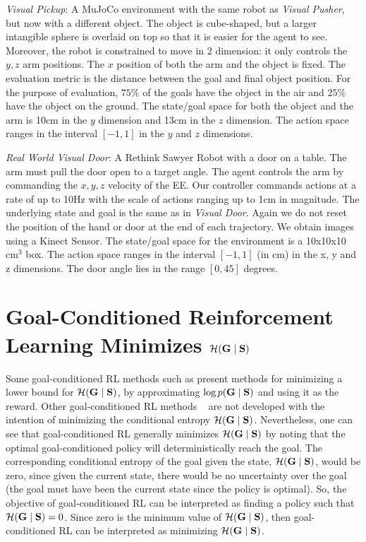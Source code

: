 \textit{Visual Pickup}: A MuJoCo environment with the same robot as \textit{Visual Pusher}, but now with a different object. The object is cube-shaped, but a larger intangible sphere is overlaid on top so that it is easier for the agent to see.
Moreover, the robot is constrained to move in 2 dimension: it only controls the $y, z$ arm positions.
The $x$ position of both the arm and the object is fixed.
The evaluation metric is the distance between the goal and final object position.
For the purpose of evaluation, $75\%$ of the goals have the object in the air and $25\%$ have the object on the ground. The state/goal space for both the object and the arm is 10cm in the $y$ dimension and 13cm in the $z$ dimension. The action space ranges in the interval $[-1, 1]$ in the $y$ and $z$ dimensions.

\textit{Real World Visual Door}:
A Rethink Sawyer Robot with a door on a table.
The arm must pull the door open to a target angle.
The agent controls the arm by commanding the $x,y,z$ velocity of the EE.
Our controller commands actions at a rate of up to 10Hz with the scale of actions ranging up to 1cm in magnitude.
The underlying state and goal is the same as in \textit{Visual Door}.
Again we do not reset the position of the hand or door at the end of each trajectory.
We obtain images using a Kinect Sensor.
The state/goal space for the environment is a 10x10x10 cm$^3$ box. The action space ranges in the interval $[-1, 1]$  (in cm) in the x, y and z dimensions. The door angle lies in the range $[0, 45]$ degrees.

\section{Goal-Conditioned Reinforcement Learning Minimizes ${\mathcal{H}}(\mathbf{G} \mid {\mathbf{S}})$}\label{sec:analysis-appendix}
Some goal-conditioned RL methods such as \citet{wardefarley2018discern,nair2018rig} present methods for minimizing a lower bound for ${\mathcal{H}}(\mathbf{G} \mid {\mathbf{S}})$, by approximating $\log p(\mathbf{G} \mid {\mathbf{S}})$ and using it as the reward.
Other goal-conditioned RL methods
~\citep{kaelbling1993goals,lillicrap2015continuous, schaul2015uva, andrychowicz2017her, pong2018tdm,florensa2018selfsupervised}
are not developed with the intention of minimizing the conditional entropy ${\mathcal{H}}(\mathbf{G} \mid {\mathbf{S}})$.
Nevertheless, one can see that goal-conditioned RL generally minimizes ${\mathcal{H}}(\mathbf{G} \mid {\mathbf{S}})$ by noting that the optimal goal-conditioned policy will deterministically reach the goal.
The corresponding conditional entropy of the goal given the state, ${\mathcal{H}}(\mathbf{G} \mid {\mathbf{S}})$, would be zero, since given the current state, there would be no uncertainty over the goal (the goal must have been the current state since the policy is optimal).
So, the objective of goal-conditioned RL can be interpreted as finding a policy such that ${\mathcal{H}}(\mathbf{G} \mid {\mathbf{S}}) = 0$.
Since zero is the minimum value of ${\mathcal{H}}(\mathbf{G} \mid {\mathbf{S}})$, then goal-conditioned RL can be interpreted as minimizing ${\mathcal{H}}(\mathbf{G} \mid {\mathbf{S}})$.